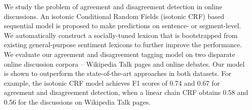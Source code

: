 We study the problem of agreement and disagreement detection in online discussions. An isotonic Conditional Random Fields (isotonic CRF) based sequential model is proposed to make predictions on sentence- or segment-level. We automatically construct a socially-tuned lexicon that is bootstrapped from existing general-purpose sentiment lexicons to further improve the performance. We evaluate our agreement and disagreement tagging model on two disparate online discussion corpora -- Wikipedia Talk pages and online debates. Our model is shown to outperform the state-of-the-art approaches in both datasets. For example, the isotonic CRF model achieves F1 scores of 0.74 and 0.67 for agreement and disagreement detection, when a linear chain CRF obtains 0.58 and 0.56 for the discussions on Wikipedia Talk pages.
